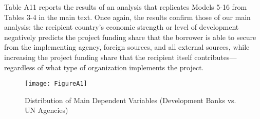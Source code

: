 \documentclass{article}
\begin{document}
Table A11 reports the results of an analysis that replicates Models 5-16 from Tables 3-4 in the main text.  Once again, the results confirm those of our main analysis: the recipient country’s economic strength or level of development negatively predicts the project funding share that the borrower is able to secure from the implementing agency, foreign sources, and all external sources, while increasing the project funding share that the recipient itself contributes---regardless of what type of organization implements the project.

\begin{figure}[H]
	\centering
	\caption{Distribution of Main Dependent Variables (Development Banks vs. UN Agencies)}
	\texttt{[image: FigureA1]}
	\label{fig:figureA1}
\end{figure}
\end{document}
